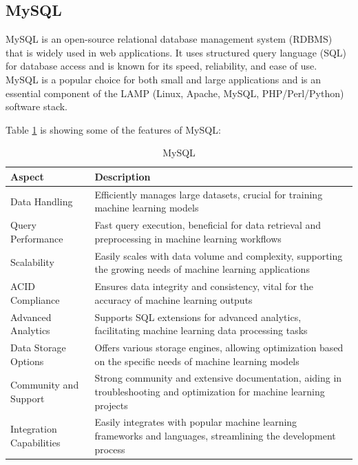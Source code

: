 \subsection{MySQL}
MySQL is an open-source relational database management system (RDBMS) that is widely used in web applications. It uses structured query language (SQL) for database access and is known for its speed, reliability, and ease of use. MySQL is a popular choice for both small and large applications and is an essential component of the LAMP (Linux, Apache, MySQL, PHP/Perl/Python) software stack.

Table \ref{tab:mysql} is showing some of the features of MySQL\cite{mysql}:

\begin{table}[H]
    \centering
    \begin{tabularx}{\textwidth}{|l|X|}
        \hline
        \textbf{Aspect}          & \textbf{Description}                                                                                                   \\
        \hline
        Data Handling            & Efficiently manages large datasets, crucial for training machine learning models                                       \\
        \hline
        Query Performance        & Fast query execution, beneficial for data retrieval and preprocessing in machine learning workflows                    \\
        \hline
        Scalability              & Easily scales with data volume and complexity, supporting the growing needs of machine learning applications           \\
        \hline
        ACID Compliance          & Ensures data integrity and consistency, vital for the accuracy of machine learning outputs                             \\
        \hline
        Advanced Analytics       & Supports SQL extensions for advanced analytics, facilitating machine learning data processing tasks                    \\
        \hline
        Data Storage Options     & Offers various storage engines, allowing optimization based on the specific needs of machine learning models           \\
        \hline
        Community and Support    & Strong community and extensive documentation, aiding in troubleshooting and optimization for machine learning projects \\
        \hline
        Integration Capabilities & Easily integrates with popular machine learning frameworks and languages, streamlining the development process         \\
        \hline
    \end{tabularx}
    \label{tab:mysql}
    \caption{MySQL}
\end{table}

